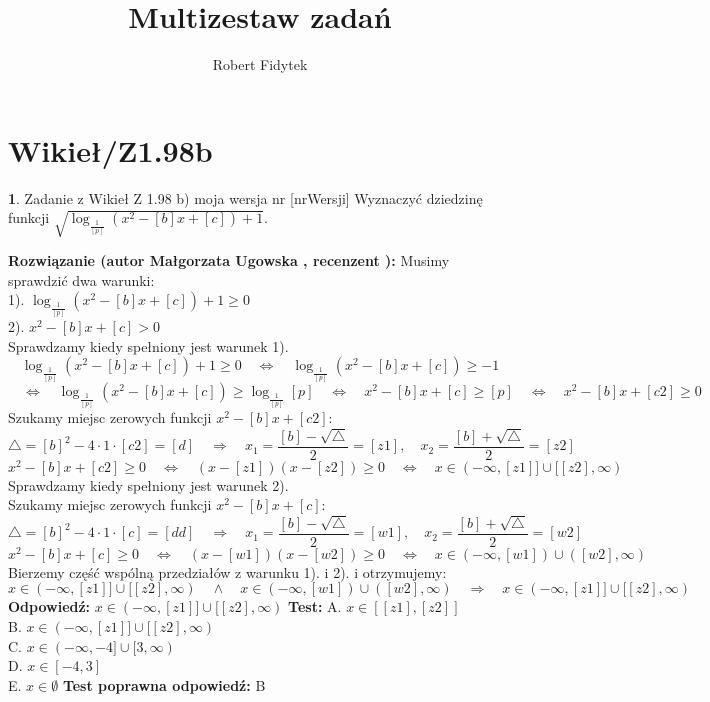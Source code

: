 \documentclass[12pt, a4paper]{article}
\title{Multizestaw zadań}
\author{Robert Fidytek}
\date{}
\theoremstyle{definition} %
\newtheorem{zad}{}
\newcommand{\kategoria}[1]{\section{#1}} %
\newcommand{\zadStart}[1]{\begin{zad}#1\newline} %
\newcommand{\zadStop}{\end{zad}}   %
\newcommand{\rozwStart}[2]{\noindent \textbf{Rozwiązanie (autor #1 , recenzent #2): }\newline} %
\newcommand{\rozwStop}{\newline}                                            %
\newcommand{\odpStart}{\noindent \textbf{Odpowiedź:}\newline}    %
\newcommand{\odpStop}{\newline}                                             %
\newcommand{\testStart}{\noindent \textbf{Test:}\newline} %
\newcommand{\testStop}{\newline} %
\newcommand{\kluczStart}{\noindent \textbf{Test poprawna odpowiedź:}\newline} %
\newcommand{\kluczStop}{\newline} %
\begin{document}
\maketitle


\kategoria{Wikieł/Z1.98b}
\zadStart{Zadanie z Wikieł Z 1.98 b) moja wersja nr [nrWersji]}
Wyznaczyć dziedzinę funkcji $\sqrt{\log_{\frac{1}{[p]}}{(x^2-[b]x+[c])} +1}$.
\zadStop
\rozwStart{Małgorzata Ugowska}{}
Musimy sprawdzić dwa warunki:\\
1). $\log_{\frac{1}{[p]}}{(x^2-[b]x+[c])} +1 \ge 0$\\
2). $x^2-[b]x+[c] >0$\\
Sprawdzamy kiedy spełniony jest warunek 1).
$$\log_{\frac{1}{[p]}}{(x^2-[b]x+[c])} +1 \ge 0 \quad \Longleftrightarrow \quad \log_{\frac{1}{[p]}}{(x^2-[b]x+[c])} \ge -1 $$
$$\quad \Longleftrightarrow \quad \log_{\frac{1}{[p]}}{(x^2-[b]x+[c])} \ge \log_{\frac{1}{[p]}}{[p]} \quad \Longleftrightarrow \quad x^2-[b]x+[c] \ge [p] \quad \Longleftrightarrow \quad x^2-[b]x+[c2] \ge 0$$
Szukamy miejsc zerowych funkcji $x^2-[b]x+[c2]$:
$$ \bigtriangleup = [b]^2-4 \cdot 1 \cdot [c2] = [d] \quad  \Longrightarrow \quad x_1=\frac{[b]-\sqrt{\bigtriangleup}}{2} = [z1], \quad x_2=\frac{[b]+\sqrt{\bigtriangleup}}{2} = [z2]$$
$$x^2-[b]x+[c2] \ge 0 \quad \Longleftrightarrow \quad (x-[z1])(x-[z2]) \ge 0 \quad \Longleftrightarrow \quad x \in (-\infty, [z1]] \cup [[z2],\infty)$$
Sprawdzamy kiedy spełniony jest warunek 2).\\
Szukamy miejsc zerowych funkcji $x^2-[b]x+[c]$:
$$ \bigtriangleup = [b]^2-4 \cdot 1 \cdot [c] = [dd] \quad  \Longrightarrow \quad x_1=\frac{[b]-\sqrt{\bigtriangleup}}{2} = [w1], \quad x_2=\frac{[b]+\sqrt{\bigtriangleup}}{2} = [w2]$$
$$x^2-[b]x+[c] \ge 0 \quad \Longleftrightarrow \quad (x-[w1])(x-[w2]) \ge 0 \quad \Longleftrightarrow \quad x \in (-\infty, [w1]) \cup ([w2],\infty)$$
Bierzemy czę\'sć wspólną przedziałów z warunku 1). i 2). i otrzymujemy:
$$ x \in (-\infty, [z1]] \cup [[z2],\infty) \quad \land \quad x \in (-\infty, [w1]) \cup ([w2],\infty) \quad  \Longrightarrow \quad x \in (-\infty, [z1]] \cup [[z2],\infty)$$
\rozwStop
\odpStart
$x \in (-\infty, [z1]] \cup [[z2],\infty)$
\odpStop
\testStart
A. $x \in [[z1],[z2]]$\\
B. $x \in (-\infty, [z1]] \cup [[z2],\infty)$\\
C. $x \in (-\infty, -4] \cup [3,\infty)$\\
D. $x \in [-4,3]$\\
E. $x \in \emptyset$
\testStop
\kluczStart
B
\kluczStop
\end{document}
